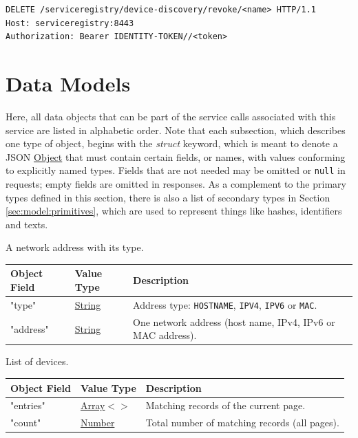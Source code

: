 \documentclass[a4paper]{arrowhead}
\newcommand{\mref}[2][]{{\textcolor{ArrowheadPurple}{\hyperref[sec:model:#2]{\ifstrempty{#1}{#2}{#1}}}}}
\newcommand{\oref}[1]{{\textcolor{ArrowheadBlue}{\hyperref[sec:operations:#1]{#1}}}}
\newcommand{\pref}[1]{{\textcolor{ArrowheadGrey}{\hyperref[sec:model:primitives:#1]{#1}}}}
\begin{document}
\begin{lstlisting}[label={lst:revoke},caption={An \oref{revoke} invocation.}]
DELETE /serviceregistry/device-discovery/revoke/<name> HTTP/1.1
Host: serviceregistry:8443
Authorization: Bearer IDENTITY-TOKEN//<token>
\end{lstlisting}

\newpage

\section{Data Models}
\label{sec:model}

Here, all data objects that can be part of the service calls associated with this service are listed in alphabetic order.
Note that each subsection, which describes one type of object, begins with the \textit{struct} keyword, which is meant to denote a JSON \pref{Object} that must contain certain fields, or names, with values conforming to explicitly named types.
Fields that are not needed may be omitted or \texttt{null} in requests; empty fields are omitted in responses.
As a complement to the primary types defined in this section, there is also a list of secondary types in Section \ref{sec:model:primitives}, which are used to represent things like hashes, identifiers and texts.


A network address with its type.


\noindent\begin{tabularx}{\textwidth}{| >{\raggedright\arraybackslash}p{3.9cm} | >{\raggedright\arraybackslash\small}p{5.3cm} | X |} \hline
\rowcolor{gray!33} Object Field & Value Type & Description \\ \hline
"type" & \pref{String} & Address type: \texttt{HOSTNAME}, \texttt{IPV4}, \texttt{IPV6} or \texttt{MAC}. \\ \hline
"address" & \pref{String} & One network address (host name, IPv4, IPv6 or MAC address). \\ \hline
\end{tabularx}




List of devices.


\noindent\begin{tabularx}{\textwidth}{| >{\raggedright\arraybackslash}p{3.9cm} | >{\raggedright\arraybackslash\small}p{5.3cm} | X |} \hline
\rowcolor{gray!33} Object Field & Value Type & Description \\ \hline
"entries" & \pref{Array}$<$\allowbreak{}\mref{DeviceResponse}$>$ & Matching records of the current page. \\ \hline
"count" & \pref{Number} & Total number of matching records (all pages). \\ \hline
\end{tabularx}
\end{document}
